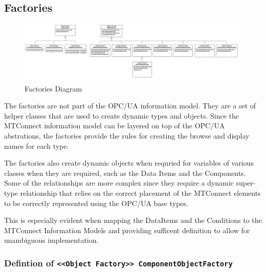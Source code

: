 \FloatBarrier
\subsection{Factories}

\begin{figure}[ht]
  \centering
    \includegraphics[width=1.0\textwidth]{diagrams/Factories.png}
  \caption{Factories Diagram}
  \label{fig:Factories}
\end{figure}

\FloatBarrier


The factories are not part of the OPC/UA information model. They are a set of helper 
classes that are used to create dynamic types and objects. Since the MTConnect 
information model can be layered on top of the OPC/UA abstrations, the factories
provide the rules for creating the browse and display names for each type.

The factories also create dynamic objects when requried for variables of various
classes when they are required, such as the Data Items and the Components. Some of the
relationships are more complex since they require a dynamic super-type relationship that
relies on the correct placement of the MTConnect elements to be correctly 
represented using the OPC/UA base types.

This is especially evident when mapping the DataItems and the Conditions to the 
MTConnect Information Models and providing sufficent definition to allow for 
unambiguous implementation.

\subsubsection{Defintion of \texttt{<<Object Factory>> ComponentObjectFactory}} \label{type:ComponentObjectFactory}

\FloatBarrier



